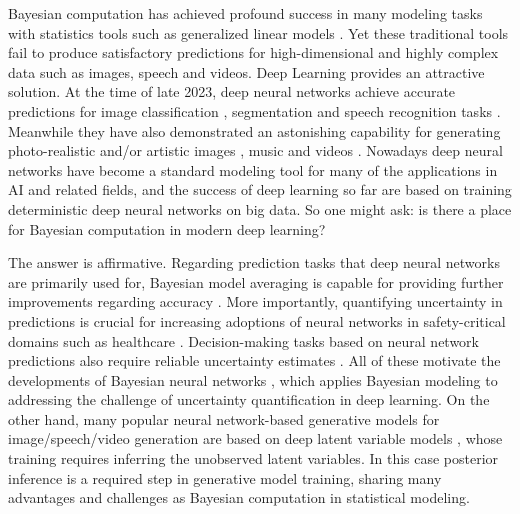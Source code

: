 Bayesian computation has achieved profound success in many modeling tasks with statistics tools such as generalized linear models \citep{nelder1972generalized,dobson2018introduction}. Yet these traditional tools fail to produce satisfactory predictions for high-dimensional and highly complex data such as images, speech and videos. Deep Learning \citep{lecun2015deep} provides an attractive solution. At the time of late 2023, deep neural networks achieve accurate predictions for image classification \citep{dehghani2023scaling}, segmentation \citep{kirillov2023segment} and speech recognition tasks \citep{zhang2023google}. Meanwhile they have also demonstrated an astonishing capability for generating photo-realistic and/or artistic images \citep{rombach2022high}, music \citep{agostinelli2023musiclm} and videos \citep{liang2022nuwa}. Nowadays deep neural networks have become a standard modeling tool for many of the applications in AI and related fields, and the success of deep learning so far are based on training deterministic deep neural networks on big data. So one might ask: is there a place for Bayesian computation in modern deep learning? 

The answer is affirmative. Regarding prediction tasks that deep neural networks are primarily used for, Bayesian model averaging is capable for providing further improvements regarding accuracy \citep{wilson2020bayesian}. More importantly, quantifying uncertainty in predictions is crucial for increasing adoptions of neural networks in safety-critical domains such as healthcare \citep{gal2016thesis}. Decision-making tasks based on neural network predictions also require reliable uncertainty estimates \citep{savage1954bayes,jaynes2003probability}. All of these motivate the developments of Bayesian neural networks \citep{mackay:practical1992,neal1996bayesian,blundell2015bbp}, which applies Bayesian modeling to addressing the challenge of uncertainty quantification in deep learning.  
%
On the other hand, many popular neural network-based generative models for image/speech/video generation are based on deep latent variable models \citep{welling2014auto,rezende:vae2014}, whose training requires inferring the unobserved latent variables. In this case posterior inference is a required step in generative model training, sharing many advantages and challenges as Bayesian computation in statistical modeling.


